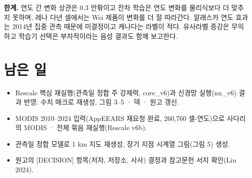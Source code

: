 \documentclass[10pt]{article}
\begin{document}
\textbf{한계.} 연도 간 변화 상관은 0.3 안팎이고 잔차 학습은 연도 변화를 물리식보다 더 맞추지 못하며, 레나 다년 셀에서는 Wei 제품이 변화를 더 잘 따라간다. 알래스카 연도 효과는 2014년 집중 관측 때문에 미결정이고 캐나다는 라벨이 적다. 유사라벨 증강은 무익하고 학습기 선택은 부차적이라는 음성 결과도 함께 보고한다.

\section{남은 일}
\begin{itemize}[leftmargin=1.4em,itemsep=0.05em]
\item Rescale 핵심 재실행(관측일 정합 주 강제력, core\_v6)과 신경망 실행(nn\_v6) 결과 반영: 수치 매크로 재생성, 그림 3--5 · 덱 · 원고 갱신.
\item MODIS 2010--2024 입력(AppEEARS 재요청 완료, 260,760 셀-연도)으로 사다리의 MODIS · 전체 묶음 재실행(Rescale v6b).
\item 관측일 정합 모델로 1 km 지도 재생성, 장기 지점 시계열 그림(그림 5) 생성.
\item 원고의 [DECISION] 항목(저자, 저장소, 사사) 결정과 참고문헌 서지 확인(Liu 2024).
\end{itemize}
\end{document}

